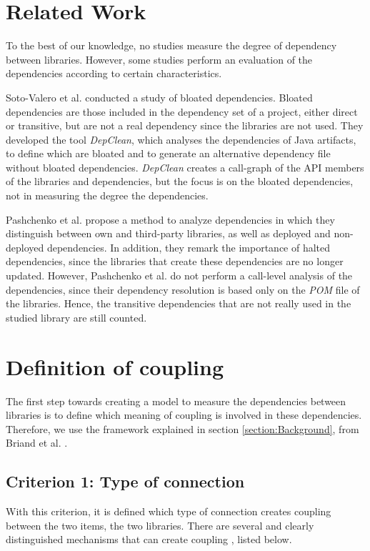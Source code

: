 \documentclass[a4paper]{article}
\begin{document}
\section{Related Work}
To the best of our knowledge, no studies measure the degree of dependency between libraries. However, some studies perform an evaluation of the dependencies according to certain characteristics.

Soto-Valero et al. \cite{soto2020comprehensive} conducted a study of bloated dependencies. Bloated dependencies are those included in the dependency set of a project, either direct or transitive, but are not a real dependency since the libraries are not used. They developed the tool \textit{DepClean}, which analyses the dependencies of Java artifacts, to define which are bloated and to generate an alternative dependency file without bloated dependencies. \textit{DepClean} creates a call-graph of the API members of the libraries and dependencies, but the focus is on the bloated dependencies, not in measuring the degree the dependencies.

Pashchenko et al. \cite{pashchenko2018vulnerable} propose a method to analyze dependencies in which they distinguish between own and third-party libraries, as well as deployed and non-deployed dependencies. In addition, they remark the importance of halted dependencies, since the libraries that create these dependencies are no longer updated. However, Pashchenko et al. do not perform a call-level analysis of the dependencies, since their dependency resolution is based only on the \textit{POM} file of the libraries. Hence, the transitive dependencies that are not really used in the studied library are still counted.

\section{Definition of coupling}
The first step towards creating a model to measure the dependencies between libraries is to define which meaning of coupling is involved in these dependencies. Therefore, we use the framework explained in section \ref{section:Background}, from Briand et al. \cite{briand1999unified}.

\subsection{Criterion 1: Type of connection}
With this criterion, it is defined which type of connection creates coupling between the two items, the two libraries. There are several and clearly distinguished mechanisms that can create coupling \cite{briand1999unified}, listed below.
\end{document}
